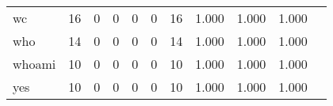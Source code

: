 \begin{longtable}{lp{1.2cm}p{1.2cm}p{1.2cm}p{1.2cm}p{1.2cm}p{1.2cm}p{1.2cm}p{1.2cm}p{1.2cm}p{1.2cm}}
wc        &                                    16 &                                                  0 &                                                  0 &                                                  0 &                                                  0 &                                                 16 &                                              1.000 &                                              1.000 &                                              1.000 \\
who       &                                    14 &                                                  0 &                                                  0 &                                                  0 &                                                  0 &                                                 14 &                                              1.000 &                                              1.000 &                                              1.000 \\
whoami    &                                    10 &                                                  0 &                                                  0 &                                                  0 &                                                  0 &                                                 10 &                                              1.000 &                                              1.000 &                                              1.000 \\
yes       &                                    10 &                                                  0 &                                                  0 &                                                  0 &                                                  0 &                                                 10 &                                              1.000 &                                              1.000 &                                              1.000 \\
\end{longtable}
